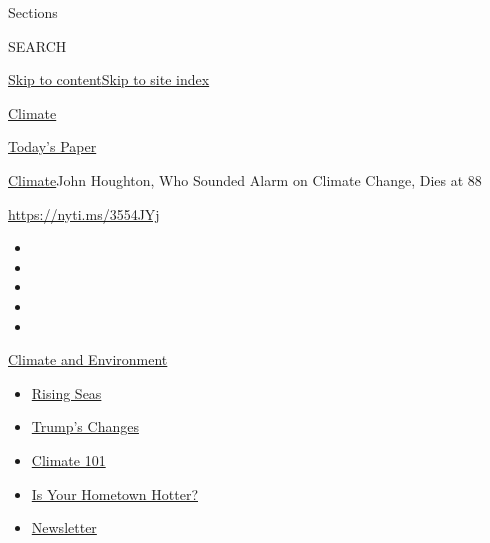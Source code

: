 Sections

SEARCH

\protect\hyperlink{site-content}{Skip to
content}\protect\hyperlink{site-index}{Skip to site index}

\href{https://www.nytimes3xbfgragh.onion/section/climate}{Climate}

\href{https://myaccount.nytimes3xbfgragh.onion/auth/login?response_type=cookie\&client_id=vi}{}

\href{https://www.nytimes3xbfgragh.onion/section/todayspaper}{Today's
Paper}

\href{/section/climate}{Climate}\textbar{}John Houghton, Who Sounded
Alarm on Climate Change, Dies at 88

\url{https://nyti.ms/3554JYj}

\begin{itemize}
\item
\item
\item
\item
\item
\end{itemize}

\href{https://www.nytimes3xbfgragh.onion/section/climate?action=click\&pgtype=Article\&state=default\&region=TOP_BANNER\&context=storylines_menu}{Climate
and Environment}

\begin{itemize}
\tightlist
\item
  \href{https://www.nytimes3xbfgragh.onion/2020/07/30/climate/sea-level-inland-floods.html?action=click\&pgtype=Article\&state=default\&region=TOP_BANNER\&context=storylines_menu}{Rising
  Seas}
\item
  \href{https://www.nytimes3xbfgragh.onion/interactive/2020/climate/trump-environment-rollbacks.html?action=click\&pgtype=Article\&state=default\&region=TOP_BANNER\&context=storylines_menu}{Trump's
  Changes}
\item
  \href{https://www.nytimes3xbfgragh.onion/interactive/2020/04/19/climate/climate-crash-course-1.html?action=click\&pgtype=Article\&state=default\&region=TOP_BANNER\&context=storylines_menu}{Climate
  101}
\item
  \href{https://www.nytimes3xbfgragh.onion/interactive/2018/08/30/climate/how-much-hotter-is-your-hometown.html?action=click\&pgtype=Article\&state=default\&region=TOP_BANNER\&context=storylines_menu}{Is
  Your Hometown Hotter?}
\item
  \href{https://www.nytimes3xbfgragh.onion/newsletters/climate-change?action=click\&pgtype=Article\&state=default\&region=TOP_BANNER\&context=storylines_menu}{Newsletter}
\end{itemize}

